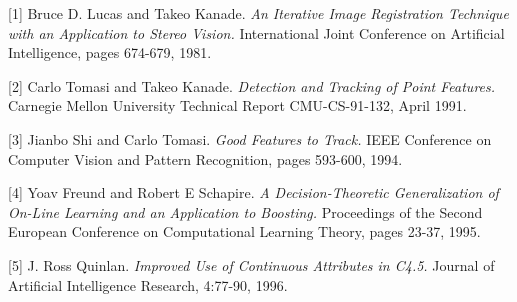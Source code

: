 \documentclass{article} %
\begin{document}

\small{
[1] Bruce D. Lucas and Takeo Kanade. {\it An Iterative Image Registration Technique with an Application to Stereo Vision.} International Joint Conference on Artificial Intelligence, pages 674-679, 1981.

[2] Carlo Tomasi and Takeo Kanade. {\it Detection and Tracking of Point Features.} Carnegie Mellon University Technical Report CMU-CS-91-132, April 1991.

[3] Jianbo Shi and Carlo Tomasi. {\it Good Features to Track.} IEEE Conference on Computer Vision and Pattern Recognition, pages 593-600, 1994.

[4] Yoav Freund and Robert E Schapire. {\it A Decision-Theoretic Generalization of On-Line Learning and an Application to Boosting.} Proceedings of the Second European Conference on Computational Learning Theory, pages 23-37, 1995.

[5] J. Ross Quinlan. {\it Improved Use of Continuous Attributes in C4.5.} Journal of Artificial Intelligence Research, 4:77-90, 1996.
}
\end{document}
